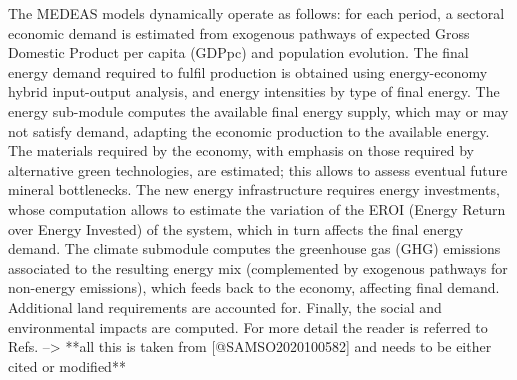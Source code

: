 The MEDEAS models dynamically operate as follows: for each period, a sectoral economic demand is estimated from exogenous pathways of expected Gross Domestic Product per capita  (GDPpc) and population evolution. The final energy demand required to fulfil production is obtained using energy-economy hybrid input-output analysis, and energy intensities by type of final energy. The energy sub-module computes the available final energy supply, which may or may not satisfy demand, adapting the economic production to the available energy. The materials required by the economy, with emphasis on those required by alternative green technologies, are estimated; this allows to assess eventual future mineral bottlenecks. The new energy infrastructure requires energy investments, whose computation allows to estimate the variation of the EROI (Energy Return over Energy Invested) of the system, which in turn affects the final energy demand. The climate submodule computes the greenhouse gas (GHG) emissions associated to the resulting energy mix (complemented by exogenous pathways for non-energy emissions), which feeds back to the economy, affecting final demand. Additional land requirements are accounted for. Finally, the social and environmental impacts are computed. For more detail the reader is referred to Refs. --> **all this is taken from [@SAMSO2020100582] and needs to be either cited or modified**



